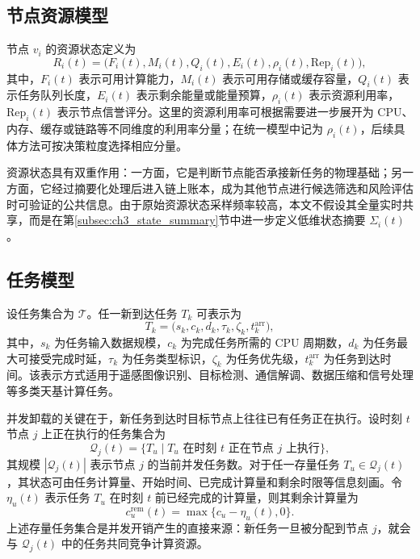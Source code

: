 \subsection{节点资源模型}
\label{subsec:ch3_resource_model}

节点 $v_i$ 的资源状态定义为
\begin{equation}
    R_i(t)=\big(F_i(t),M_i(t),Q_i(t),E_i(t),\rho_i(t),\mathrm{Rep}_i(t)\big),
    \label{eq:ch3_resource_state}
\end{equation}
其中，$F_i(t)$ 表示可用计算能力，$M_i(t)$ 表示可用存储或缓存容量，$Q_i(t)$ 表示任务队列长度，$E_i(t)$ 表示剩余能量或能量预算，$\rho_i(t)$ 表示资源利用率，$\mathrm{Rep}_i(t)$ 表示节点信誉评分。这里的资源利用率可根据需要进一步展开为 CPU、内存、缓存或链路等不同维度的利用率分量；在统一模型中记为 $\rho_i(t)$，后续具体方法可按决策粒度选择相应分量。

资源状态具有双重作用：一方面，它是判断节点能否承接新任务的物理基础；另一方面，它经过摘要化处理后进入链上账本，成为其他节点进行候选筛选和风险评估时可验证的公共信息。由于原始资源状态采样频率较高，本文不假设其全量实时共享，而是在第\ref{subsec:ch3_state_summary}节中进一步定义低维状态摘要 $\Sigma_i(t)$。

\subsection{任务模型}
\label{subsec:ch3_task_model}

设任务集合为 $\mathcal{T}$。任一新到达任务 $T_k$ 可表示为
\begin{equation}
    T_k=\big(s_k,c_k,d_k,\tau_k,\zeta_k,t_k^{\mathrm{arr}}\big),
    \label{eq:ch3_task_model}
\end{equation}
其中，$s_k$ 为任务输入数据规模，$c_k$ 为完成任务所需的 CPU 周期数，$d_k$ 为任务最大可接受完成时延，$\tau_k$ 为任务类型标识，$\zeta_k$ 为任务优先级，$t_k^{\mathrm{arr}}$ 为任务到达时间。该表示方式适用于遥感图像识别、目标检测、通信解调、数据压缩和信号处理等多类天基计算任务。

并发卸载的关键在于，新任务到达时目标节点上往往已有任务正在执行。设时刻 $t$ 节点 $j$ 上正在执行的任务集合为
\begin{equation}
    \mathcal{Q}_j(t)=\{T_u\mid T_u \text{ 在时刻 } t \text{ 正在节点 } j \text{ 上执行}\},
    \label{eq:ch3_executing_task_set}
\end{equation}
其规模 $|\mathcal{Q}_j(t)|$ 表示节点 $j$ 的当前并发任务数。对于任一存量任务 $T_u\in\mathcal{Q}_j(t)$，其状态可由任务计算量、开始时间、已完成计算量和剩余时限等信息刻画。令 $\eta_u(t)$ 表示任务 $T_u$ 在时刻 $t$ 前已经完成的计算量，则其剩余计算量为
\begin{equation}
    c_u^{\mathrm{rem}}(t)=\max\{c_u-\eta_u(t),0\}.
    \label{eq:ch3_remaining_compute}
\end{equation}
上述存量任务集合是并发开销产生的直接来源：新任务一旦被分配到节点 $j$，就会与 $\mathcal{Q}_j(t)$ 中的任务共同竞争计算资源。

